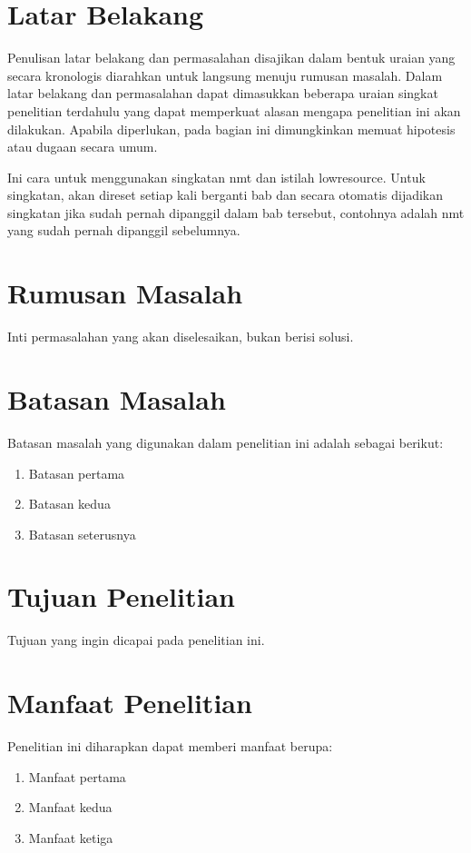 \section{Latar Belakang}
Penulisan latar belakang dan permasalahan disajikan dalam bentuk uraian yang secara kronologis diarahkan untuk langsung menuju rumusan masalah. Dalam latar belakang dan permasalahan dapat dimasukkan beberapa uraian singkat penelitian terdahulu yang dapat memperkuat alasan mengapa penelitian ini akan dilakukan. Apabila diperlukan, pada bagian ini dimungkinkan memuat hipotesis atau dugaan secara umum. 

Ini cara untuk menggunakan singkatan \gls{nmt} dan istilah \gls{lowresource}. Untuk singkatan, akan direset setiap kali berganti bab dan secara otomatis dijadikan singkatan jika sudah pernah dipanggil dalam bab tersebut, contohnya adalah \gls{nmt} yang sudah pernah dipanggil sebelumnya.

\section{Rumusan Masalah}
Inti permasalahan yang akan diselesaikan, bukan berisi solusi. 

\section{Batasan Masalah}
Batasan masalah yang digunakan dalam penelitian ini adalah sebagai berikut: 
\begin{enumerate}
    \item Batasan pertama
    \item Batasan kedua 
    \item Batasan seterusnya 
\end{enumerate}	

\section{Tujuan Penelitian}
Tujuan yang ingin dicapai pada penelitian ini.

\section{Manfaat Penelitian}
Penelitian ini diharapkan dapat memberi manfaat berupa: 
\begin{enumerate}
    \item Manfaat pertama 
    \item Manfaat kedua 
    \item Manfaat ketiga 
\end{enumerate}
